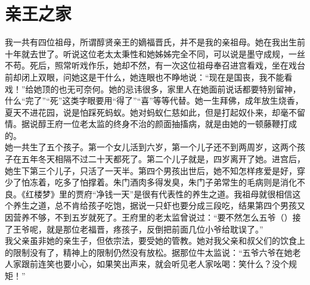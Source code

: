 \fancyhead[RO]{} %
\fancyhead[LE]{} %
\chapter*{亲王之家}
\thispagestyle{empty}
我一共有四位祖母，所谓醇贤亲王的嫡福晋氏，并不是我的亲祖母。她在我出生前十年就去世了。听说这位老太太秉性和她姊姊完全不同，可以说是墨守成规，一丝不苟。死后，照常听戏作乐，她却不然，有一次这位祖母奉召进宫看戏，坐在戏台前却闭上双眼，问她这是干什么，她连眼也不睁地说：“现在是国丧，我不能看戏！”给她顶的也无可奈何。她的忌讳很多，家里人在她面前说话都要特别留神，什么“完了”“死”这类字眼要用“得了”“喜”等等代替。她一生拜佛，成年放生烧香，夏天不进花园，说是怕踩死蚂蚁。她对蚂蚁仁慈如此，但是打起奴仆来，却毫不留情。据说醇王府一位老太监的终身不治的颜面抽搐病，就是由她的一顿藤鞭打成的。\\

她一共生了五个孩子。第一个女儿活到六岁，第一个儿子还不到两周岁，这两个孩子在五年冬天相隔不过二十天都死了。第二个儿子就是，四岁离开了她。进宫后，她生下第三个儿子，只活了一天半。第四个男孩出世后，她不知怎样疼爱是好，穿少了怕冻着，吃多了怕撑着。朱门酒肉多得发臭，朱门子弟常生的毛病则是消化不良。《红楼梦》里的贾府“净钱一天”是很有代表性的养生之道。我祖母就很相信这个养生之道，总不肯给孩子吃饱，据说一只虾也要分成三段吃，结果第四个男孩又因营养不够，不到五岁就死了。王府里的老太监曾说过：“要不然怎么五爷（）接了王爷呢，就是那位老福晋，疼孩子，反倒把前面几位小爷给耽误了。”\\

我父亲虽非她的亲生子，但依宗法，要受她的管教。她对我父亲和叔父们的饮食上的限制没有了，精神上的限制仍然没有放松。据那位牛太监说：“五爷六爷在她老人家跟前连笑也要小心，如果笑出声来，就会听见老人家吆喝：笑什么？没个规矩！”\\

